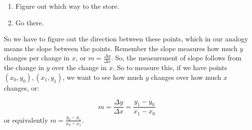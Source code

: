 \begin{enumerate}
\item Figure out which way to the store.
\item Go there.
\end{enumerate}

So we have to figure out the direction between these points, which in our analogy means the slope between the points.  Remember the slope measures how much $y$ changes per change in $x$, or $m=\frac{\Delta y}{\Delta x}$.  So, the measurement of slope follows from the change in $y$ over the change in $x$.  So to measure this, if we have points $(x_0, y_0), (x_1, y_1)$, we want to see how much $y$ changes over how much $x$ changes, or:

$$m=\frac{\Delta y}{\Delta x}=\frac{y_1-y_0}{x_1-x_0}$$
or equivalently $m=\frac{y_0-y_1}{x_0-x_1}$.


